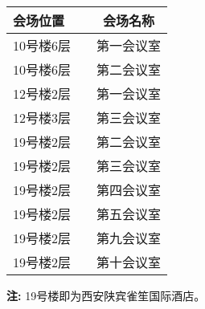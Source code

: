 \documentclass[UTF8]{book}
\begin{document}
\def\zhongsan{ 10号楼6层，第一会议室 }
\def\zhonger{ 12号楼2层，第一会议室 }
\def\zhongyi{ 19号楼2层，第九会议室 }
\def\daer{ 12号楼3层，第三会议室 }
\def\dayi{ 19号楼2层，第十会议室 }
\def\dasan{ 10号楼6层，第二会议室 }
\def\xiaoyi{ 19号楼2层，第二会议室 }
\def\xiaoer{ 19号楼2层，第三会议室 }
\def\xiaosan{ 19号楼2层，第四会议室 }
\def\npusroom{19号楼2层, 第五会议室}
\begin{table}[H]
\begin{center}
\begin{tabular}{lcc}
    \toprule
    会场位置 & \phantom{空白} & 会场名称\\ \midrule
    10号楼6层 & \phantom{空白} & 第一会议室 \\
    10号楼6层 & \phantom{空白} & 第二会议室 \\
    12号楼2层 & \phantom{空白} & 第一会议室 \\
    12号楼3层 & \phantom{空白} & 第三会议室 \\
    19号楼2层 & \phantom{空白} & 第二会议室 \\
    19号楼2层 & \phantom{空白} & 第三会议室 \\
    19号楼2层 & \phantom{空白} & 第四会议室 \\ 
    19号楼2层  & \phantom{空白} & 第五会议室 \\ %
    19号楼2层 & \phantom{空白} & 第九会议室 \\
    19号楼2层 & \phantom{空白} & 第十会议室 \\\bottomrule
\end{tabular}
\end{center}
\end{table}
{{\bf 注:} 19号楼即为西安陕宾雀笙国际酒店。}
\end{document}
